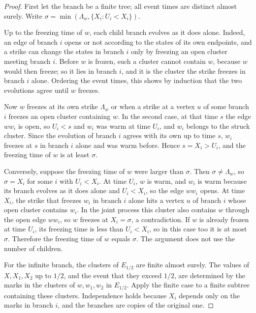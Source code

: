 \documentclass[11pt]{amsart}
\theoremstyle{remark}
\numberwithin{equation}{section}
\begin{document}
\begin{proof}
First let the branch be a finite tree; all event times are distinct
almost surely. Write $\sigma=\min(\Lambda_w,\{X_i:U_i<X_i\})$.

Up to the freezing time of $w$, each child branch evolves as it
does alone. Indeed, an edge of branch $i$ opens or not according to the
states of its own endpoints, and a strike can change the states in
branch $i$ only by freezing an open cluster meeting branch $i$. Before
$w$ is frozen, such a cluster cannot contain $w$, because $w$ would then
freeze; so it lies in branch $i$, and it is the cluster the strike
freezes in branch $i$ alone. Ordering the event times, this shows by
induction that the two evolutions agree until $w$ freezes.

Now $w$ freezes at its own strike $\Lambda_w$ or when a strike at a
vertex $u$ of some branch $i$ freezes an open cluster containing $w$.
In the second case, at that time $s$ the edge $ww_i$ is open, so $U_i<s$
and $w_i$ was warm at time $U_i$, and $w_i$ belongs to the struck
cluster. Since the evolution of branch $i$ agrees with its own up to
time $s$, $w_i$ freezes at $s$ in branch $i$ alone and was warm before.
Hence $s=X_i>U_i$, and the freezing time of $w$ is at least
$\sigma$.

Conversely, suppose the freezing time of $w$ were larger than
$\sigma$. Then $\sigma\neq\Lambda_w$, so $\sigma=X_i$ for some $i$ with
$U_i<X_i$. At time $U_i$, $w$ is warm, and $w_i$ is warm because its
branch evolves as it does alone and $U_i<X_i$, so the edge $ww_i$ opens.
At time $X_i$, the strike that freezes $w_i$ in branch $i$ alone hits a
vertex $u$ of branch $i$ whose open cluster contains $w_i$. In the joint
process this cluster also contains $w$ through the open edge $ww_i$, so
$w$ freezes at $X_i=\sigma$, a contradiction. If $w$ is already frozen
at time $U_i$, its freezing time is less than $U_i<X_i$, so in
this case too it is at most $\sigma$. Therefore the freezing time
of $w$ equals $\sigma$. The argument does not use the number of children.

For the infinite branch, the clusters of $E_{1/2}$ are finite almost
surely. The values of $X,X_1,X_2$ up to $1/2$, and the event that they
exceed $1/2$, are determined by the marks in the clusters of $w,w_1,w_2$
in $E_{1/2}$. Apply the finite case to a finite subtree containing these
clusters. Independence holds because $X_i$ depends only on the marks in
branch $i$, and the branches are copies of the original one.
\end{proof}
\end{document}
